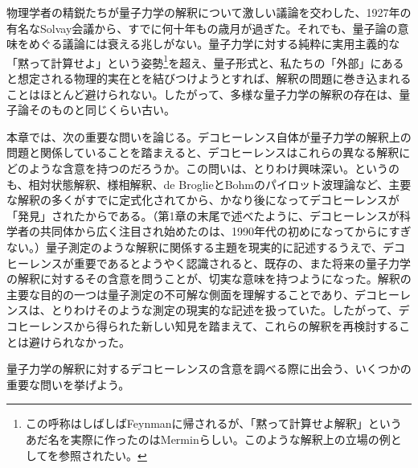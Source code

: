 
\hypertarget{srcpage:329}{}\label{srcpage:329}
\setcounter{footnote}{0}

物理学者の精鋭たちが量子力学の解釈について激しい議論を交わした、1927年の有名なSolvay会議\cite{ref385}から、すでに何十年もの歳月が過ぎた。それでも、量子論の意味をめぐる議論には衰える兆しがない。量子力学に対する純粋に実用主義的な「黙って計算せよ」という姿勢\footnote{この呼称はしばしばFeynmanに帰されるが、「黙って計算せよ解釈」というあだ名を実際に作ったのはMermin\cite{ref386}らしい。このような解釈上の立場の例として\cite{ref044}を参照されたい。}を超え、量子形式と、私たちの「外部」にあると想定される物理的実在とを結びつけようとすれば、解釈の問題に巻き込まれることはほとんど避けられない。したがって、多様な量子力学の解釈の存在は、量子論そのものと同じくらい古い。

本章では、次の重要な問いを論じる。デコヒーレンス自体が量子力学の解釈上の問題と関係していることを踏まえると、デコヒーレンスはこれらの異なる解釈にどのような含意を持つのだろうか。この問いは、とりわけ興味深い。というのも、相対状態解釈、様相解釈、de BroglieとBohmのパイロット波理論など、主要な解釈の多くがすでに定式化されてから、かなり後になってデコヒーレンスが「発見」されたからである。（第1章の末尾で述べたように、デコヒーレンスが科学者の共同体から広く注目され始めたのは、1990年代の初めになってからにすぎない。）量子測定のような解釈に関係する主題を現実的に記述するうえで、デコヒーレンスが重要であるとようやく認識されると、既存の、また将来の量子力学の解釈に対するその含意を問うことが、切実な意味を持つようになった。解釈の主要な目的の一つは量子測定の不可解な側面を理解することであり、デコヒーレンスは、とりわけそのような測定の現実的な記述を扱っていた。したがって、デコヒーレンスから得られた新しい知見を踏まえて、これらの解釈を再検討することは避けられなかった。

量子力学の解釈に対するデコヒーレンスの含意を調べる際に出会う、いくつかの重要な問いを挙げよう。

